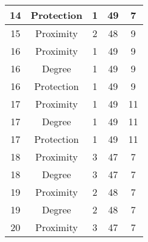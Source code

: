 \documentclass[results.tex]{subfiles}
\begin{document}
\begin{center}
\begin{tabular}{| c || c | c | c | c |}
            \hline
            14                      & Protection                   & 1                      & 49                      & 7                    \\
            \hline
            15                      & Proximity                    & 2                      & 48                      & 9                    \\
            \hline
            16                      & Proximity                    & 1                      & 49                      & 9                    \\
            \hline
            16                      & Degree                       & 1                      & 49                      & 9                    \\
            \hline
            16                      & Protection                   & 1                      & 49                      & 9                    \\
            \hline
            17                      & Proximity                    & 1                      & 49                      & 11                   \\
            \hline
            17                      & Degree                       & 1                      & 49                      & 11                   \\
            \hline
            17                      & Protection                   & 1                      & 49                      & 11                   \\
            \hline
            18                      & Proximity                    & 3                      & 47                      & 7                    \\
            \hline
            18                      & Degree                       & 3                      & 47                      & 7                    \\
            \hline
            19                      & Proximity                    & 2                      & 48                      & 7                    \\
            \hline
            19                      & Degree                       & 2                      & 48                      & 7                    \\
            \hline
            20                      & Proximity                    & 3                      & 47                      & 7                    \\

\end{tabular}
\end{center}
\end{document}
